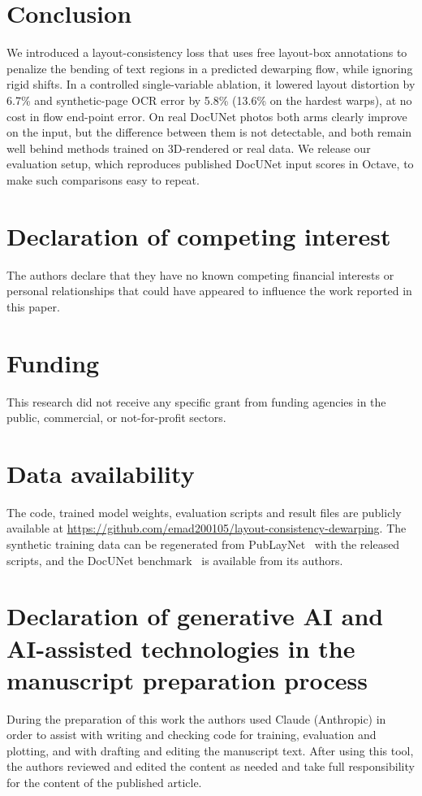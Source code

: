 \documentclass[a4paper,fleqn]{cas-sc}
\begin{document}
\section{Conclusion}
We introduced a layout-consistency loss that uses free layout-box annotations to penalize the bending of text regions in a predicted dewarping flow, while ignoring rigid shifts. In a controlled single-variable ablation, it lowered layout distortion by 6.7\% and synthetic-page OCR error by 5.8\% (13.6\% on the hardest warps), at no cost in flow end-point error. On real DocUNet photos both arms clearly improve on the input, but the difference between them is not detectable, and both remain well behind methods trained on 3D-rendered or real data. We release our evaluation setup, which reproduces published DocUNet input scores in Octave, to make such comparisons easy to repeat.

\printcredits

\section*{Declaration of competing interest}
The authors declare that they have no known competing financial interests or personal relationships that could have appeared to influence the work reported in this paper.

\section*{Funding}
This research did not receive any specific grant from funding agencies in the public, commercial, or not-for-profit sectors.

\section*{Data availability}
The code, trained model weights, evaluation scripts and result files are publicly available at \url{https://github.com/emad200105/layout-consistency-dewarping}. The synthetic training data can be regenerated from PubLayNet~\cite{zhong2019publaynet} with the released scripts, and the DocUNet benchmark~\cite{ma2018docunet} is available from its authors.

\section*{Declaration of generative AI and AI-assisted technologies in the manuscript preparation process}
During the preparation of this work the authors used Claude (Anthropic) in order to assist with writing and checking code for training, evaluation and plotting, and with drafting and editing the manuscript text. After using this tool, the authors reviewed and edited the content as needed and take full responsibility for the content of the published article.



\end{document}
